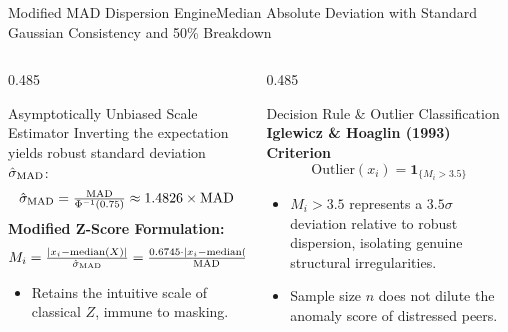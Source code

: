 \begin{frame}{Modified MAD Dispersion Engine}{Median Absolute Deviation with Standard Gaussian Consistency and 50\% Breakdown}
\begin{columns}[T,onlytextwidth]
\begin{column}{0.485\textwidth}
            \begin{mathcard}[height=2.74cm]{Asymptotically Unbiased Scale Estimator}
                \fontsize{5.7pt}{6.9pt}\selectfont
                Inverting the expectation yields robust standard deviation $\hat{\sigma}_{\operatorname{MAD}}$:
                \begin{equation*}
                    \textstyle \hat{\sigma}_{\operatorname{MAD}} = \frac{\operatorname{MAD}}{\Phi^{-1}(0.75)} \approx 1.4826 \times \operatorname{MAD}
                \end{equation*}
                \textbf{\color{deepemerald}Modified Z-Score Formulation:}
                \begin{equation*}
                    \textstyle M_i = \frac{|x_i - \operatorname{median}(X)|}{\hat{\sigma}_{\operatorname{MAD}}} = \frac{0.6745 \cdot |x_i - \operatorname{median}(X)|}{\operatorname{MAD}}
                \end{equation*}
                \begin{itemize}
                    \setlength{\itemsep}{0.8pt}
                    \item Retains the intuitive scale of classical $Z$, immune to masking.
                \end{itemize}
            \end{mathcard}
        \end{column}

        \begin{column}{0.485\textwidth}
            \begin{quantcard}[height=2.74cm]{Decision Rule \& Outlier Classification}
                \fontsize{5.8pt}{7.0pt}\selectfont
                \textbf{\color{deepemerald}Iglewicz \& Hoaglin (1993) Criterion}
                \begin{equation*}
                    \textstyle \text{Outlier}(x_i) = \mathbf{1}_{\{M_i > 3.5\}}
                \end{equation*}
                \begin{itemize}
                    \setlength{\itemsep}{1.2pt}
                    \item $M_i > 3.5$ represents a $3.5\sigma$ deviation relative to robust dispersion, isolating genuine structural irregularities.
                    \item Sample size $n$ does not dilute the anomaly score of distressed peers.
                \end{itemize}
                \vfill
            \end{quantcard}


\end{column}
\end{columns}
\end{frame}
